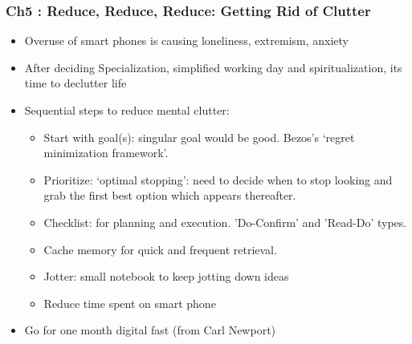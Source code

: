 \begin{frame}[fragile]\frametitle{Ch5 : Reduce, Reduce, Reduce: Getting Rid of Clutter}

\begin{itemize}
\item Overuse of smart phones is causing loneliness, extremism, anxiety
\item After deciding Specialization, simplified working day and spiritualization, its time to declutter life
\item Sequential steps to reduce mental clutter:
	\begin{itemize}
	\item Start with goal(s): singular goal would be good. Bezos's `regret minimization framework'.
	\item Prioritize:  `optimal stopping': need to decide when to stop looking and grab the first best option which appears thereafter.
	\item Checklist: for planning and execution. 'Do-Confirm' and 'Read-Do' types.
	\item Cache memory for quick and frequent retrieval.
	\item Jotter: small notebook to keep jotting down ideas
	\item Reduce time spent on smart phone
	\end{itemize}
\item Go for one month digital fast (from Carl Newport)

\end{itemize}

\end{frame}

